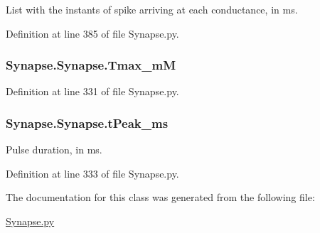 List with the instants of spike arriving at each conductance, in ms. 



Definition at line 385 of file Synapse.\-py.

\hypertarget{class_synapse_1_1_synapse_ae4bcd698c5be77c2a6629d511d75f046}{
\subsubsection[{Tmax\-\_\-m\-M}]{\setlength{\rightskip}{0pt plus 5cm}Synapse.\-Synapse.\-Tmax\-\_\-m\-M}}\label{class_synapse_1_1_synapse_ae4bcd698c5be77c2a6629d511d75f046}


Definition at line 331 of file Synapse.\-py.

\hypertarget{class_synapse_1_1_synapse_a09b9b092efcb0d6745fa32fadcd46375}{
\subsubsection[{t\-Peak\-\_\-ms}]{\setlength{\rightskip}{0pt plus 5cm}Synapse.\-Synapse.\-t\-Peak\-\_\-ms}}\label{class_synapse_1_1_synapse_a09b9b092efcb0d6745fa32fadcd46375}


Pulse duration, in ms. 



Definition at line 333 of file Synapse.\-py.



The documentation for this class was generated from the following file\-:\begin{DoxyCompactItemize}
\item 
\hyperlink{_synapse_8py}{Synapse.\-py}\end{DoxyCompactItemize}
